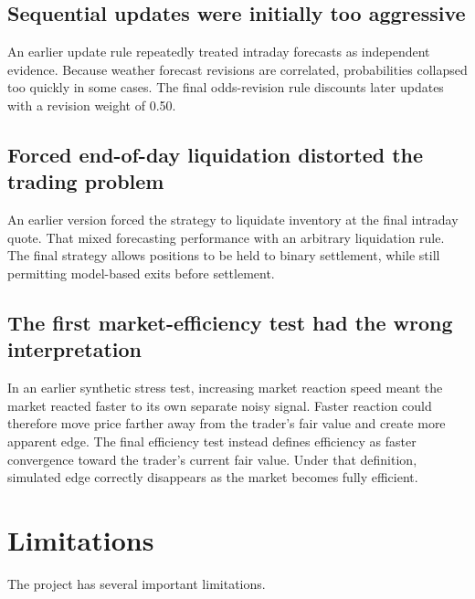 \documentclass[11pt]{article}
\begin{document}
\subsection{Sequential updates were initially too aggressive}

An earlier update rule repeatedly treated intraday forecasts as independent evidence. Because weather forecast revisions are correlated, probabilities collapsed too quickly in some cases. The final odds-revision rule discounts later updates with a revision weight of 0.50.

\subsection{Forced end-of-day liquidation distorted the trading problem}

An earlier version forced the strategy to liquidate inventory at the final intraday quote. That mixed forecasting performance with an arbitrary liquidation rule. The final strategy allows positions to be held to binary settlement, while still permitting model-based exits before settlement.

\subsection{The first market-efficiency test had the wrong interpretation}

In an earlier synthetic stress test, increasing market reaction speed meant the market reacted faster to its own separate noisy signal. Faster reaction could therefore move price farther away from the trader's fair value and create more apparent edge. The final efficiency test instead defines efficiency as faster convergence toward the trader's current fair value. Under that definition, simulated edge correctly disappears as the market becomes fully efficient.

\section{Limitations}

The project has several important limitations.
\end{document}
